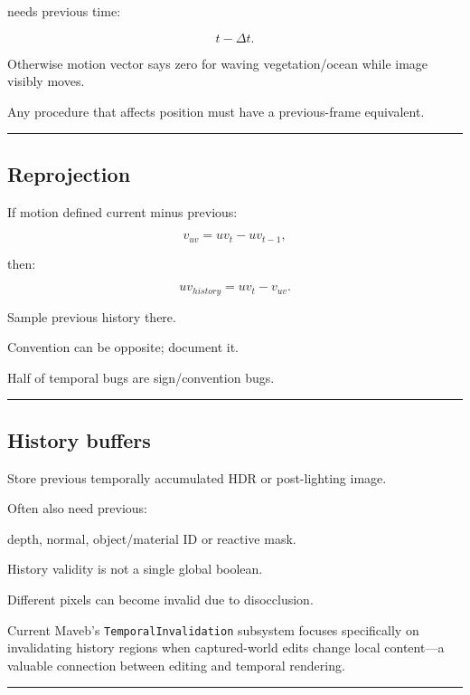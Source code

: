 needs previous time:

\[
t-\Delta t.
\]

Otherwise motion vector says zero for waving vegetation/ocean while image visibly moves.

Any procedure that affects position must have a previous-frame equivalent.

\begin{center}\rule{0.5\linewidth}{0.5pt}\end{center}

\subsection{Reprojection}\label{04-visual-computing-ii-ch040-reprojection}

If motion defined current minus previous:

\[
v_{uv}
=
uv_t-uv_{t-1},
\]

then:

\[
\boxed{
uv_{history}
=
uv_t-v_{uv}.
}
\]

Sample previous history there.

Convention can be opposite; document it.

Half of temporal bugs are sign/convention bugs.

\begin{center}\rule{0.5\linewidth}{0.5pt}\end{center}

\subsection{History buffers}\label{04-visual-computing-ii-ch040-history-buffers}

Store previous temporally accumulated HDR or post-lighting image.

Often also need previous:

depth, normal, object/material ID or reactive mask.

History validity is not a single global boolean.

Different pixels can become invalid due to disocclusion.

Current Maveb's \texttt{TemporalInvalidation} subsystem focuses specifically on invalidating history regions when captured-world edits change local content---a valuable connection between editing and temporal rendering.

\begin{center}\rule{0.5\linewidth}{0.5pt}\end{center}

